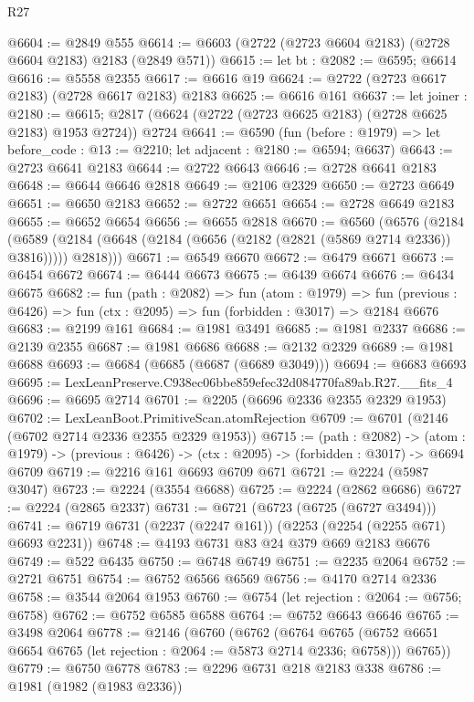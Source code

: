 \begin{lexlean}{R27}
\begin{coremodule}
@6604 := @2849 @555
@6614 := @6603 (@2722 (@2723 @6604 @2183) (@2728 @6604 @2183) @2183 (@2849 @571))
@6615 := let bt : @2082 := @6595; @6614
@6616 := @5558 @2355
@6617 := @6616 @19
@6624 := @2722 (@2723 @6617 @2183) (@2728 @6617 @2183) @2183
@6625 := @6616 @161
@6637 := let joiner : @2180 := @6615;
  @2817 (@6624 (@2722 (@2723 @6625 @2183) (@2728 @6625 @2183) @1953 @2724)) @2724
@6641 := @6590
    (fun (before : @1979) => let before_code : @13 := @2210; let adjacent : @2180 := @6594; @6637)
@6643 := @2723 @6641 @2183
@6644 := @2722 @6643
@6646 := @2728 @6641 @2183
@6648 := @6644 @6646 @2818
@6649 := @2106 @2329
@6650 := @2723 @6649
@6651 := @6650 @2183
@6652 := @2722 @6651
@6654 := @2728 @6649 @2183
@6655 := @6652 @6654
@6656 := @6655 @2818
@6670 := @6560
    (@6576
      (@2184
        (@6589 (@2184 (@6648 (@2184 (@6656 (@2182 (@2821 (@5869 @2714 @2336)) @3816))))) @2818)))
@6671 := @6549 @6670
@6672 := @6479 @6671
@6673 := @6454 @6672
@6674 := @6444 @6673
@6675 := @6439 @6674
@6676 := @6434 @6675
@6682 := fun (path : @2082) =>
  fun (atom : @1979) =>
  fun (previous : @6426) => fun (ctx : @2095) => fun (forbidden : @3017) => @2184 @6676
@6683 := @2199 @161
@6684 := @1981 @3491
@6685 := @1981 @2337
@6686 := @2139 @2355
@6687 := @1981 @6686
@6688 := @2132 @2329
@6689 := @1981 @6688
@6693 := @6684 (@6685 (@6687 (@6689 @3049)))
@6694 := @6683 @6693
@6695 := LexLeanPreserve.C938ec06bbe859efec32d084770fa89ab.R27.__fits_4
@6696 := @6695 @2714
@6701 := @2205 (@6696 @2336 @2355 @2329 @1953)
@6702 := LexLeanBoot.PrimitiveScan.atomRejection
@6709 := @6701 (@2146 (@6702 @2714 @2336 @2355 @2329 @1953))
@6715 := (path : @2082) ->
  (atom : @1979) -> (previous : @6426) -> (ctx : @2095) -> (forbidden : @3017) -> @6694 @6709
@6719 := @2216 @161 @6693 @6709 @671
@6721 := @2224 (@5987 @3047)
@6723 := @2224 (@3554 @6688)
@6725 := @2224 (@2862 @6686)
@6727 := @2224 (@2865 @2337)
@6731 := @6721 (@6723 (@6725 (@6727 @3494)))
@6741 := @6719 @6731 (@2237 (@2247 @161)) (@2253 (@2254 (@2255 @671) @6693 @2231))
@6748 := @4193 @6731 @83 @24 @379 @669 @2183 @6676
@6749 := @522 @6435
@6750 := @6748 @6749
@6751 := @2235 @2064
@6752 := @2721 @6751
@6754 := @6752 @6566 @6569
@6756 := @4170 @2714 @2336
@6758 := @3544 @2064 @1953
@6760 := @6754 (let rejection : @2064 := @6756; @6758)
@6762 := @6752 @6585 @6588
@6764 := @6752 @6643 @6646
@6765 := @3498 @2064
@6778 := @2146
    (@6760
      (@6762
        (@6764 @6765 (@6752 @6651 @6654 @6765 (let rejection : @2064 := @5873 @2714 @2336; @6758)))
        @6765))
@6779 := @6750 @6778
@6783 := @2296 @6731 @218 @2183 @338
@6786 := @1981 (@1982 (@1983 @2336))

\end{coremodule}
\end{lexlean}
